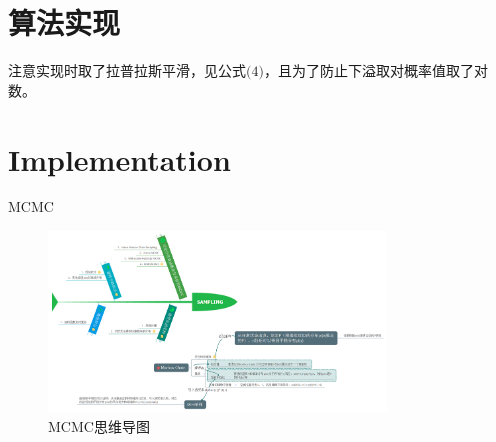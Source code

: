 \documentclass{ctexart}
\begin{document}
\section{算法实现}
%
%
注意实现时取了拉普拉斯平滑，见公式$\big(4\big)$，且为了防止下溢取对概率值取了对数。\cite{mcmc:Liu,stanf:cs229}
%
\section{Implementation}
MCMC
\begin{figure}[H]
\begin{center}
\includegraphics[width=0.8\textwidth]{fig/Sampling.png} %
\caption{MCMC思维导图}
\end{center}
\end{figure}
\end{document}
